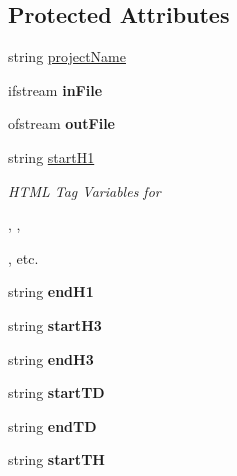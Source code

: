 \subsection*{Protected Attributes}
\begin{DoxyCompactItemize}
\item 
string \hyperlink{classPageLayout_a8a3c1ddc422df2556fbc95d0cd575a05}{project\-Name}
\item 
\hypertarget{classPageLayout_a9abec89a54a6f0dac84114919d2ad117}{ifstream {\bfseries in\-File}}\label{classPageLayout_a9abec89a54a6f0dac84114919d2ad117}

\item 
\hypertarget{classPageLayout_ad52913274f786e82e1e09f5df4bf5347}{ofstream {\bfseries out\-File}}\label{classPageLayout_ad52913274f786e82e1e09f5df4bf5347}

\item 
string \hyperlink{classHTMLTags_ae987289d0dab2e3e234048615f930d0f}{start\-H1}
\begin{DoxyCompactList}\small\item\em H\-T\-M\-L Tag Variables for 

, , 

, etc. \end{DoxyCompactList}\item 
\hypertarget{classHTMLTags_a708194dea85c068a24b7923254fd7458}{string {\bfseries end\-H1}}\label{classHTMLTags_a708194dea85c068a24b7923254fd7458}

\item 
\hypertarget{classHTMLTags_a9290221d987dfe55acd3d2002a48efa0}{string {\bfseries start\-H3}}\label{classHTMLTags_a9290221d987dfe55acd3d2002a48efa0}

\item 
\hypertarget{classHTMLTags_afa471891c94946ba4a68acd727246d66}{string {\bfseries end\-H3}}\label{classHTMLTags_afa471891c94946ba4a68acd727246d66}

\item 
\hypertarget{classHTMLTags_a827d77a9a5cc3c442421420f0713c17a}{string {\bfseries start\-T\-D}}\label{classHTMLTags_a827d77a9a5cc3c442421420f0713c17a}

\item 
\hypertarget{classHTMLTags_ac2f4aae38f9d88d90df443e1e59a5bfc}{string {\bfseries end\-T\-D}}\label{classHTMLTags_ac2f4aae38f9d88d90df443e1e59a5bfc}

\item 
\hypertarget{classHTMLTags_a71b8a6e9593c6744f75fe8fac83e39b7}{string {\bfseries start\-T\-H}}\label{classHTMLTags_a71b8a6e9593c6744f75fe8fac83e39b7}


\end{DoxyCompactItemize}
